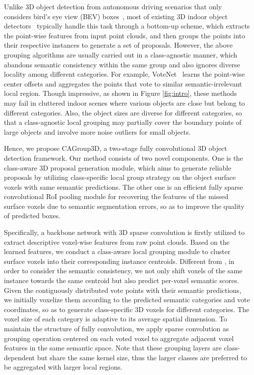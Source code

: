\documentclass{article}
\begin{document}
Unlike 3D object detection from autonomous driving scenarios that only considers bird's eye view (BEV) boxes~\cite{shi2019pointrcnn,yin2021cvpr,lang2019pointpillars,fan2021embracing,shi2020p2,shi2020pv}, most of existing 3D indoor object detectors~\cite{qi2019deep,wang2022rbgnet,liu2021group,cheng2021back,zhang2020h3dnet} typically handle this task 
through a bottom-up scheme, which extracts the point-wise features from input point clouds, and then groups the points into their respective instances to generate a set of proposals. 
However, the above grouping algorithms are usually carried out in a class-agnostic manner, which abandons semantic consistency within the same group and also ignores diverse locality among different categories. For example, VoteNet~\cite{qi2019deep} learns the point-wise center offsets and aggregates the points that vote to similar semantic-irrelevant local region. Though impressive, as shown in Figure \ref{fig:intro}, these methods may fail in cluttered indoor scenes where various objects are close but belong to different categories. Also, the object sizes are diverse for different categories, so that a class-agnostic local grouping may partially cover the boundary points of large objects and involve more noise outliers for small objects. 

Hence, we propose CAGroup3D, a two-stage fully convolutional 3D object detection framework. 
Our method consists of two novel components. One is the class-aware 3D proposal generation module, which aims to generate reliable proposals by utilizing class-specific local group strategy on the object surface voxels with same semantic predictions. The other one is an efficient fully sparse convolutional RoI pooling module for recovering the features of the missed surface voxels due to semantic segmentation errors, so as to improve the quality of predicted boxes.  

Specifically, a backbone network with 3D sparse convolution is firstly utilized to extract descriptive voxel-wise features from raw point clouds. Based on the learned features, we conduct a class-aware local grouping module to cluster surface voxels into their corresponding instance centroids. Different from \cite{qi2019deep}, in order to consider the semantic consistency, we not only shift voxels of the same instance towards the same centroid but also predict per-voxel semantic scores. Given the contiguously distributed vote points with their semantic predictions, we initially voxelize them according to the predicted semantic categories and vote coordinates, so as to generate class-specific 3D voxels for different categories. The voxel size of each category is adaptive to its average spatial dimension.
To maintain the structure of fully convolution, we apply sparse convolution as grouping operation centered on each voted voxel to aggregate adjacent voxel features in the same semantic space. Note that these grouping layers are class-dependent but share the same kernel size, thus the larger classes are preferred to be aggregated with larger local regions. 
\end{document}
